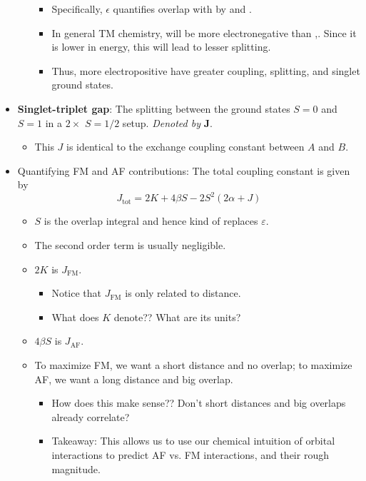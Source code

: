 \documentclass[../notes.tex]{subfiles}
\begin{document}
\begin{itemize}
\begin{itemize}
\begin{itemize}
            \item Specifically, $\epsilon$ quantifies overlap with  by  and .
            \item In general TM chemistry,  will be more electronegative than ,. Since it is lower in energy, this will lead to lesser splitting.
            \item Thus, more electropositive  have greater coupling, splitting, and singlet ground states.
        \end{itemize}
    \end{itemize}
    \item \textbf{Singlet-triplet gap}: The splitting between the ground states $S=0$ and $S=1$ in a $2\times$ $S=1/2$ setup. \emph{Denoted by} $\bm{J}$.
    \begin{itemize}
        \item This $J$ is identical to the exchange coupling constant between $A$ and $B$.
    \end{itemize}
    \item Quantifying FM and AF contributions: The total coupling constant is given by
    \begin{equation*}
        J_\text{tot} = 2K+4\beta S-2S^2(2\alpha+J)
    \end{equation*}
    \begin{itemize}
        \item $S$ is the overlap integral and hence kind of replaces $\varepsilon$.
        \item The second order term is usually negligible.
        \item $2K$ is $J_\text{FM}$.
        \begin{itemize}
            \item Notice that $J_\text{FM}$ is only related to distance.
            \item What does $K$ denote?? What are its units?
        \end{itemize}
        \item $4\beta S$ is $J_\text{AF}$.
        \item To maximize FM, we want a short distance and no overlap; to maximize AF, we want a long distance and big overlap.
        \begin{itemize}
            \item How does this make sense?? Don't short distances and big overlaps already correlate?
            \item Takeaway: This allows us to use our chemical intuition of orbital interactions to predict AF vs. FM interactions, and their rough magnitude.

\end{itemize}
\end{itemize}
\end{itemize}
\end{document}
